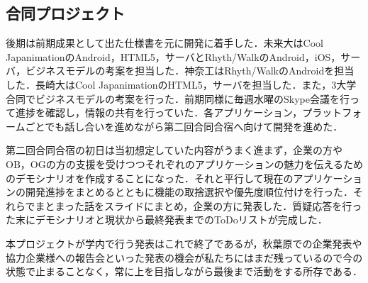 \subsection{合同プロジェクト}
\par 後期は前期成果として出た仕様書を元に開発に着手した．未来大はCool JapanimationのAndroid，HTML5，サーバとRhyth/WalkのAndroid，iOS，サーバ，ビジネスモデルの考案を担当した．神奈工はRhyth/WalkのAndroidを担当した．長崎大はCool JapanimationのHTML5，サーバを担当した．また，3大学合同でビジネスモデルの考案を行った．前期同様に毎週水曜のSkype会議を行って進捗を確認し，情報の共有を行っていた．各アプリケーション，プラットフォームごとでも話し合いを進めながら第二回合同合宿へ向けて開発を進めた．
\par 第二回合同合宿の初日は当初想定していた内容がうまく進まず，企業の方やOB，OGの方の支援を受けつつそれぞれのアプリケーションの魅力を伝えるためのデモシナリオを作成することになった．それと平行して現在のアプリケーションの開発進捗をまとめるとともに機能の取捨選択や優先度順位付けを行った．それらでまとまった話をスライドにまとめ，企業の方に発表した．質疑応答を行った末にデモシナリオと現状から最終発表までのToDoリストが完成した．
\par 本プロジェクトが学内で行う発表はこれで終了であるが，秋葉原での企業発表や協力企業様への報告会といった発表の機会が私たちにはまだ残っているので今の状態で止まることなく，常に上を目指しながら最後まで活動をする所存である．
